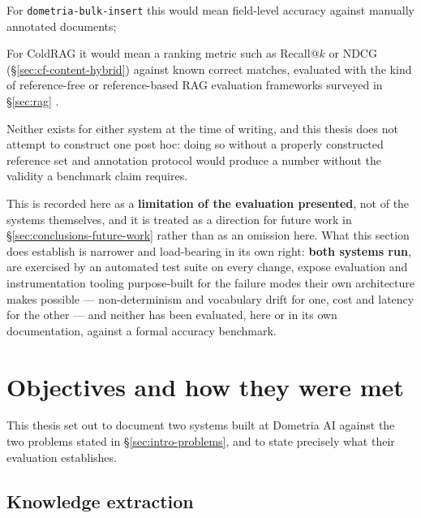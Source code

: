 \vspace{0.3cm}

For \texttt{dometria-bulk-insert} this would mean field-level accuracy against manually annotated documents;

\vspace{0.3cm}

For ColdRAG it would mean a ranking metric such as Recall@$k$ or NDCG (\S\ref{sec:cf-content-hybrid}) against known correct matches, evaluated with the kind of reference-free or reference-based RAG evaluation frameworks surveyed in \S\ref{sec:rag} \citep{es2024ragas,chen2024benchmarking}. 

\vspace{0.3cm}

Neither exists for either system at the time of writing, and this thesis does not attempt to construct one post hoc: doing so without a properly constructed reference set and annotation protocol would produce a number without the validity a benchmark claim requires.

\vspace{0.3cm}

This is recorded here as a \textbf{limitation of the evaluation presented}, not of the systems themselves, and it is treated as a direction for future work in \S\ref{sec:conclusions-future-work} rather than as an omission here. What this section does establish is narrower and load-bearing in its own right: \textbf{both systems run}, are exercised by an automated test suite on every change, expose evaluation and instrumentation tooling purpose-built for the failure modes their own architecture makes possible — non-determinism and vocabulary drift for one, cost and latency for the other — and neither has been evaluated, here or in its own documentation, against a formal accuracy benchmark.

\section{Objectives and how they were met}
\label{sec:conclusions-summary}

This thesis set out to document two systems built at Dometria AI against the two problems stated in \S\ref{sec:intro-problems}, and to state precisely what their evaluation establishes.

\subsection{Knowledge extraction}

